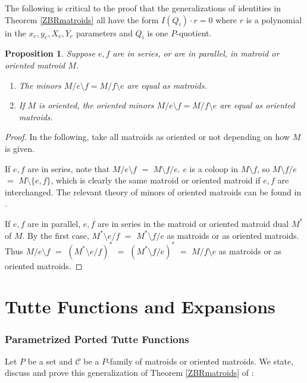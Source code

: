 \documentclass[12pt,leqno]{amsart}
\newtheorem{prop}[lem]{Proposition}
\theoremstyle{remark}
\begin{document}
The following is critical to the proof that the generalizations
of identities in Theorem \ref{ZBRmatroids} all have the form
$I(Q_i)\cdot r=0$ where $r$ is a polynomial in the $x_e,y_e,X_e,Y_e$
parameters and $Q_i$ is one $P$-quotient.

\begin{prop}
\label{SameMinorProp}
Suppose $e,f$ are in series, or are in parallel, in matroid or
oriented matroid $M$.
\begin{enumerate}
\item The minors $M/e\setminus f=M/f\setminus e$
are equal as matroids.
\item If $M$ is oriented, the oriented minors 
$M/e\setminus f=M/f\setminus e$ are equal as oriented matroids.
\end{enumerate}
\end{prop}

\begin{proof}
In the following, take all matroids as oriented or not
depending on how $M$ is given.

If $e,f$ are in series, note that $M/e\setminus f$ $=$
$M\setminus f/e$.  $e$ is a coloop in $M\setminus f$,
so $M\setminus f/e$ $=$ $M\setminus\{e,f\}$, which is
clearly the same matroid or oriented matroid if $e,f$
are interchanged.  The relevant theory of minors of oriented matroids
can be found in \cite{OMBOOK}.

If $e,f$ are in parallel, $e,f$ are in series in 
the matroid or oriented matroid dual $M^*$ of $M$.
By the first case, $M^*\setminus e/ f$ $=$
$M^*\setminus f/e$ as matroids or as oriented matroids.
Thus $M/e\setminus f$ $=$ $(M^*\setminus e/ f)^*$ $=$
$(M^*\setminus f/ e)^*$ $=$ $M/f\setminus e$ as matroids or
as oriented matroids.
\end{proof}


\part{Tutte Functions and Expansions}

\section{Parametrized Ported Tutte Functions}
\label{ParamTutteSec}
Let $P$ be a set and $\mathcal{C}$ be a $P$-family of matroids or oriented
matroids.  We state, discuss and prove this
generalization of Theorem \ref{ZBRmatroids} of \cite{Ellis-Monaghan-Traldi}:
\end{document}
